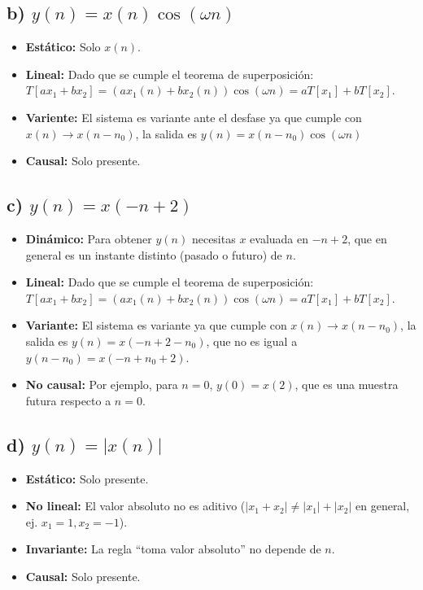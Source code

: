\documentclass[12pt,a4paper]{article}
\begin{document}
\subsection*{b) $y(n) = x(n)\cos(\omega n)$}

\begin{itemize}
\item \textbf{Estático:} Solo $x(n)$.
\item \textbf{Lineal:} Dado que se cumple el teorema de superposición: $T[ax_1 + bx_2] = (ax_1(n) + bx_2(n))\cos(\omega n) = aT[x_1] + bT[x_2]$.
\item \textbf{Variente:} El sistema es variante ante el desfase ya que cumple con $x(n) \to x(n-n_0)$, la salida es $y(n) = x(n-n_0)\cos(\omega n)$
\item \textbf{Causal:} Solo presente.
\end{itemize}

\subsection*{c) $y(n) = x(-n+2)$}

\begin{itemize}
\item \textbf{Dinámico:} Para obtener $y(n)$ necesitas $x$ evaluada en $-n+2$, que en general es un instante distinto (pasado o futuro) de $n$.
\item \textbf{Lineal:} Dado que se cumple el teorema de superposición: $T[ax_1 + bx_2] = (ax_1(n) + bx_2(n))\cos(\omega n) = aT[x_1] + bT[x_2]$.
\item \textbf{Variante:} El sistema es variante ya que cumple con $x(n) \to x(n-n_0)$, la salida es $y(n) = x(-n+2-n_0)$, que no es igual a $y(n-n_0) = x(-n+n_0+2)$.
\item \textbf{No causal:} Por ejemplo, para $n=0$, $y(0) = x(2)$, que es una muestra futura respecto a $n=0$.
\end{itemize}

\subsection*{d) $y(n) = |x(n)|$}

\begin{itemize}
\item \textbf{Estático:} Solo presente.
\item \textbf{No lineal:} El valor absoluto no es aditivo ($|x_1 + x_2| \neq |x_1| + |x_2|$ en general, ej. $x_1 = 1, x_2 = -1$).
\item \textbf{Invariante:} La regla ``toma valor absoluto'' no depende de $n$.
\item \textbf{Causal:} Solo presente.
\end{itemize}
\end{document}

